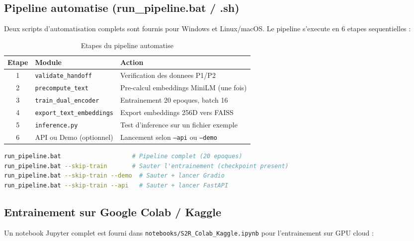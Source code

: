 \documentclass[12pt, a4paper]{article}
\begin{document}
\subsection{Pipeline automatise (run\_pipeline.bat / .sh)}

Deux scripts d'automatisation complets sont fournis pour Windows et Linux/macOS.
Le pipeline s'execute en 6 etapes sequentielles :

\begin{table}[H]
\centering
\caption{Etapes du pipeline automatise}
\begin{tabularx}{\linewidth}{c l X}
\toprule
\textbf{Etape} & \textbf{Module} & \textbf{Action} \\
\midrule
1 & \texttt{validate\_handoff} & Verification des donnees P1/P2 \\
\rowcolor{silver}
2 & \texttt{precompute\_text}  & Pre-calcul embeddings MiniLM (une fois) \\
3 & \texttt{train\_dual\_encoder} & Entrainement 20 epoques, batch 16 \\
\rowcolor{silver}
4 & \texttt{export\_text\_embeddings} & Export embeddings 256D vers FAISS \\
5 & \texttt{inference.py}     & Test d'inference sur un fichier exemple \\
\rowcolor{silver}
6 & API ou Demo (optionnel)   & Lancement selon \texttt{--api} ou \texttt{--demo} \\
\bottomrule
\end{tabularx}
\end{table}

\begin{lstlisting}[language=bash, caption={Options du pipeline Windows}]
run_pipeline.bat                    # Pipeline complet (20 epoques)
run_pipeline.bat --skip-train       # Sauter l'entrainement (checkpoint present)
run_pipeline.bat --skip-train --demo  # Sauter + lancer Gradio
run_pipeline.bat --skip-train --api   # Sauter + lancer FastAPI
\end{lstlisting}

\subsection{Entrainement sur Google Colab / Kaggle}

Un notebook Jupyter complet est fourni dans \texttt{notebooks/S2R\_Colab\_Kaggle.ipynb}
pour l'entrainement sur GPU cloud :
\end{document}
